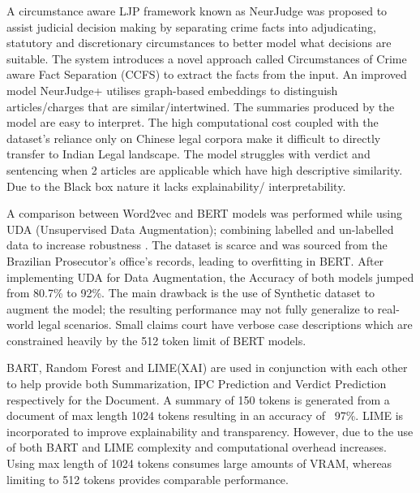 A circumstance aware LJP framework known as NeurJudge was proposed to assist judicial decision making by separating crime facts into adjudicating, statutory and discretionary circumstances to better model what decisions are suitable\cite{b3}. The system introduces a novel approach called Circumstances of Crime aware Fact Separation (CCFS) to extract the facts from the input. An improved model NeurJudge+ utilises graph-based embeddings to distinguish articles/charges that are similar/intertwined. The summaries produced by the model are easy to interpret. The high computational cost coupled with the dataset’s reliance only on Chinese legal corpora make it difficult to directly transfer to Indian Legal landscape. The model struggles with verdict and sentencing when 2 articles are applicable which have high descriptive similarity. Due to the Black box nature it lacks explainability/ interpretability.


A comparison between Word2vec and BERT models was performed while using UDA (Unsupervised Data Augmentation); combining labelled and un-labelled data to increase robustness \cite{b4}. The dataset is scarce and was sourced from the Brazilian Prosecutor’s office’s records, leading to overfitting in BERT. After implementing UDA for Data Augmentation, the Accuracy of both models jumped from 80.7\% to 92\%. The main drawback is the use of Synthetic dataset to augment the model; the resulting performance may not fully generalize to real-world legal scenarios. Small claims court have verbose case descriptions which are constrained heavily by the 512 token limit of BERT models.


BART, Random Forest and LIME(XAI) are used in conjunction with each other to help provide both Summarization, IPC Prediction and Verdict Prediction respectively for the Document. A summary of 150 tokens is generated from a document of max length 1024 tokens\cite{b5} resulting in an accuracy of ~97\%. LIME is incorporated to improve explainability and transparency. However, due to the use of both BART and LIME complexity and computational overhead increases. Using max length of 1024 tokens consumes large amounts of VRAM, whereas limiting to 512 tokens provides comparable performance.

